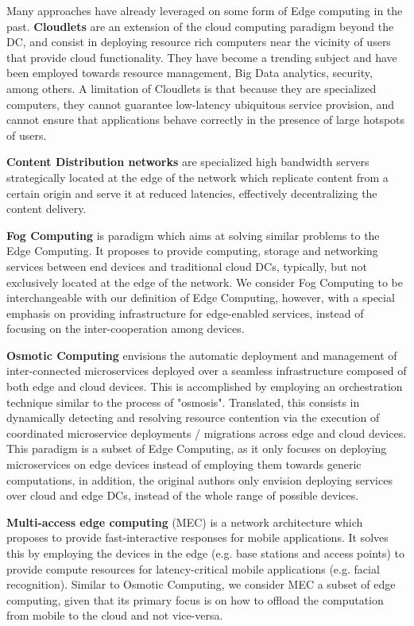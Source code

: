 Many approaches have already leveraged on some form of Edge computing in the past. \textbf{Cloudlets} \cite{10.1145/2307849.2307858} are an extension of the cloud computing paradigm beyond the DC, and consist in deploying resource rich computers near the vicinity of users that provide cloud functionality. They have become a trending subject and have been employed towards resource management, Big Data analytics, security, among others. A limitation of Cloudlets is that because they are specialized computers, they cannot guarantee low-latency ubiquitous service provision, and cannot ensure that applications behave correctly in the presence of large hotspots of users.  

\textbf{Content Distribution networks} \cite{peng2004cdn} are specialized high bandwidth servers strategically located at the edge of the network which replicate content from a certain origin and serve it at reduced latencies, effectively decentralizing the content delivery. 

\textbf{Fog Computing} \cite{bonomi2012fog} is paradigm which aims at solving similar problems to the Edge Computing. It proposes to provide computing, storage and networking services between end devices and traditional cloud DCs, typically, but not exclusively located at the edge of the network. We consider Fog Computing to be interchangeable with our definition of Edge Computing, however, with a special emphasis on providing infrastructure for edge-enabled services, instead of focusing on the inter-cooperation among devices.

\textbf{Osmotic Computing} \cite{villari2016osmotic}  envisions the automatic deployment and management of inter-connected microservices deployed over a seamless infrastructure composed of both edge and cloud devices. This is accomplished by employing an orchestration technique similar to the process of "osmosis". Translated, this consists in dynamically detecting and resolving resource contention via the execution of coordinated microservice deployments / migrations across edge and cloud devices. This paradigm is a subset of Edge Computing, as it only focuses on deploying microservices on edge devices instead of employing them towards generic computations, in addition, the original authors only envision deploying services over cloud and edge DCs, instead of the whole range of possible devices.

\textbf{Multi-access edge computing} \cite{mobile_edge_cloud} (MEC) is a network architecture which proposes to provide fast-interactive responses for mobile applications. It solves this by employing the devices in the edge (e.g. base stations and access points) to provide compute resources for latency-critical mobile applications (e.g. facial recognition). Similar to Osmotic Computing, we consider MEC a subset of edge computing, given that its primary focus is on how to offload the computation from mobile to the cloud and not vice-versa. 

